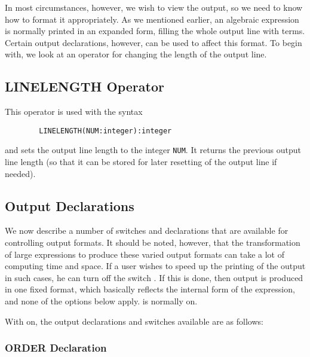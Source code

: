 In most circumstances, however, we wish to view the output, so we need to
know how to format it appropriately.  As we mentioned earlier, an
algebraic expression is normally printed in an expanded form, filling the
whole output line with terms.  Certain output declarations, however, can be used to affect this format.  To begin with,
we look at an operator for changing the length of the output line.

\subsection{LINELENGTH Operator}
\hypertarget{operator:LINELENGTH}{}

This operator is used with the syntax
\begin{verbatim}
        LINELENGTH(NUM:integer):integer
\end{verbatim}
and sets the output line length to the integer \texttt{NUM}. It returns the
previous output line length (so that it can be stored for later resetting
of the output line if needed).

\subsection{Output Declarations}
\hypertarget{switch:PRI}{}

We now describe a number of switches and declarations that are available
for controlling output formats. It should be noted, however, that the
transformation of large expressions to produce these varied output formats
can take a lot of computing time and space. If a user wishes to speed up
the printing of the output in such cases, he can turn off the switch 
. If this is done, then output is produced in one fixed
format, which basically reflects the internal form of the expression, and
none of the options below apply.  is normally on.

With  on, the output declarations
and switches available are as follows:

\subsubsection{ORDER Declaration}
\hypertarget{command:ORDER}{}

